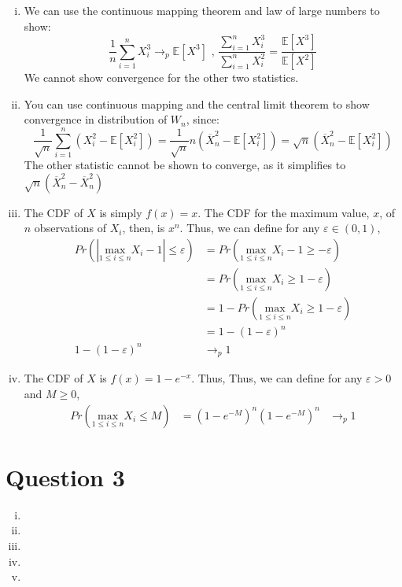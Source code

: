 \documentclass{article}
\newcommand{\olx}[1]{\overline{X}_{#1}}
\newcommand{\est}[1]{\frac{1}{#1}\sum_{i=1}^{#1}}
\renewcommand{\Pr}[1]{\text{Pr}\left(#1\right)}
\renewcommand{\Pr}[1]{Pr\left(#1\right)}
\newcommand{\E}[1]{\mathbb{E}\left[#1\right]}%
\begin{document}
\begin{enumerate}[(i)]
	\item We can use the continuous mapping theorem and law of large numbers to show:
		\[
			\est{n}X_i^3 \rightarrow_p \E{X^3}\text{   ,   }\frac{\sum_{i=1}^n X_i^3}{\sum_{i=1}^n X_i^2}  = \frac{\E{X^3}}{\E{X^2}}
		\]
		We cannot show convergence for the other two statistics.
	
	\item You can use continuous mapping and the central limit theorem to show convergence in distribution of $W_n$, since:
		\[
			\frac{1}{\sqrt{n}}\sum_{i=1}^n\left(X_i^2-\E{X_i^2}\right) = \frac{1}{\sqrt{n}}n\left(\olx{n}^2-\E{X_i^2}\right) = \sqrt{n}\left(\olx{n}^2-\E{X_i^2}\right) 
		\]
		The other statistic cannot be shown to converge, as it simplifies to $\sqrt{n}\left(\olx{n}^2-\olx{n}^2\right)$
	
	\item The CDF of $X$ is simply $f(x)=x$. The CDF for the maximum value, $x$, of $n$ observations of $X_i$, then, is $x^n$. Thus, we can define for any $\varepsilon\in(0,1)$,
		\begin{align*}
			\Pr{|\underset{1\leq i\leq n}{\text{max}}X_i-1|\leq\varepsilon} &= \Pr{\underset{1\leq i\leq n}{\text{max}}X_i-1\geq-\varepsilon}			\\
																			&= \Pr{\underset{1\leq i\leq n}{\text{max}}X_i\geq 1-\varepsilon}		\\
																			&= 1 - \Pr{\underset{1\leq i\leq n}{\text{max}}X_i\geq 1-\varepsilon}	\\
																			&= 1 - (1-\varepsilon)^n	\\
													1 - (1-\varepsilon)^n	&\rightarrow_p 1
		\end{align*}
	
	\item The CDF of $X$ is $f(x)=1-e^{-x}$. Thus, Thus, we can define for any $\varepsilon>0$ and $M\geq 0$,
		\begin{align*}
			\Pr{\underset{1\leq i\leq n}{\text{max}}X_i\leq M} 	&= (1-e^{-M})^n
												(1-e^{-M})^n 	&\rightarrow_p 1
		\end{align*}
\end{enumerate}


\section*{Question 3}

\begin{enumerate}[(i)]
	\item 
	
	\item 
	
	\item 
	
	\item 
	
	\item 
\end{enumerate}

\end{document}
